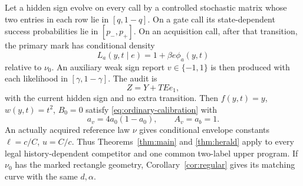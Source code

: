 \begin{theorem}\label{thm:classical}
Let a hidden sign evolve on every call by a controlled stochastic matrix whose two entries in each row lie in $[q,1-q]$. On a gate call its state-dependent success probabilities lie in $[p_-,p_+]$. On an acquisition call, after that transition, the primary mark has conditional density
\[
 L_a(y,t\mid e)=1+\beta e\phi_a(y,t)
\]
relative to $\nu_0$. An auxiliary weak sign report $v\in\{-1,1\}$ is then produced with each likelihood in $[\gamma,1-\gamma]$. The audit is
\[
 Z=Y+TEe_1,
\]
with the current hidden sign and no extra transition. Then $f(y,t)=y$, $w(y,t)=t^2$, $B_0=0$ satisfy \eqref{eq:ordinary-calibration} with
\begin{equation}\label{eq:raw-calibration}
 a_v=4a_0(1-a_0),\qquad A_v=a_b=1.
\end{equation}
An actually acquired reference law $\nu$ gives conditional envelope constants $\ell=c/C$, $u=C/c$. Thus Theorems~\ref{thm:main} and \ref{thm:herald} apply to every legal history-dependent competitor and one common two-label upper program. If $\nu_0$ has the marked rectangle geometry, Corollary~\ref{cor:regular} gives its matching curve with the same $d,\alpha$.
\end{theorem}
